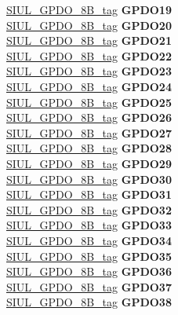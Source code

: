 \begin{DoxyCompactItemize}
\begin{tabbing}
\>\>\mbox{\hyperlink{unionSIUL__GPDO__8B__tag}{SIUL\_GPDO\_8B\_tag}} {\bfseries GPDO19}\\
\>\>\mbox{\hyperlink{unionSIUL__GPDO__8B__tag}{SIUL\_GPDO\_8B\_tag}} {\bfseries GPDO20}\\
\>\>\mbox{\hyperlink{unionSIUL__GPDO__8B__tag}{SIUL\_GPDO\_8B\_tag}} {\bfseries GPDO21}\\
\>\>\mbox{\hyperlink{unionSIUL__GPDO__8B__tag}{SIUL\_GPDO\_8B\_tag}} {\bfseries GPDO22}\\
\>\>\mbox{\hyperlink{unionSIUL__GPDO__8B__tag}{SIUL\_GPDO\_8B\_tag}} {\bfseries GPDO23}\\
\>\>\mbox{\hyperlink{unionSIUL__GPDO__8B__tag}{SIUL\_GPDO\_8B\_tag}} {\bfseries GPDO24}\\
\>\>\mbox{\hyperlink{unionSIUL__GPDO__8B__tag}{SIUL\_GPDO\_8B\_tag}} {\bfseries GPDO25}\\
\>\>\mbox{\hyperlink{unionSIUL__GPDO__8B__tag}{SIUL\_GPDO\_8B\_tag}} {\bfseries GPDO26}\\
\>\>\mbox{\hyperlink{unionSIUL__GPDO__8B__tag}{SIUL\_GPDO\_8B\_tag}} {\bfseries GPDO27}\\
\>\>\mbox{\hyperlink{unionSIUL__GPDO__8B__tag}{SIUL\_GPDO\_8B\_tag}} {\bfseries GPDO28}\\
\>\>\mbox{\hyperlink{unionSIUL__GPDO__8B__tag}{SIUL\_GPDO\_8B\_tag}} {\bfseries GPDO29}\\
\>\>\mbox{\hyperlink{unionSIUL__GPDO__8B__tag}{SIUL\_GPDO\_8B\_tag}} {\bfseries GPDO30}\\
\>\>\mbox{\hyperlink{unionSIUL__GPDO__8B__tag}{SIUL\_GPDO\_8B\_tag}} {\bfseries GPDO31}\\
\>\>\mbox{\hyperlink{unionSIUL__GPDO__8B__tag}{SIUL\_GPDO\_8B\_tag}} {\bfseries GPDO32}\\
\>\>\mbox{\hyperlink{unionSIUL__GPDO__8B__tag}{SIUL\_GPDO\_8B\_tag}} {\bfseries GPDO33}\\
\>\>\mbox{\hyperlink{unionSIUL__GPDO__8B__tag}{SIUL\_GPDO\_8B\_tag}} {\bfseries GPDO34}\\
\>\>\mbox{\hyperlink{unionSIUL__GPDO__8B__tag}{SIUL\_GPDO\_8B\_tag}} {\bfseries GPDO35}\\
\>\>\mbox{\hyperlink{unionSIUL__GPDO__8B__tag}{SIUL\_GPDO\_8B\_tag}} {\bfseries GPDO36}\\
\>\>\mbox{\hyperlink{unionSIUL__GPDO__8B__tag}{SIUL\_GPDO\_8B\_tag}} {\bfseries GPDO37}\\
\>\>\mbox{\hyperlink{unionSIUL__GPDO__8B__tag}{SIUL\_GPDO\_8B\_tag}} {\bfseries GPDO38}\\

\end{tabbing}
\end{DoxyCompactItemize}
